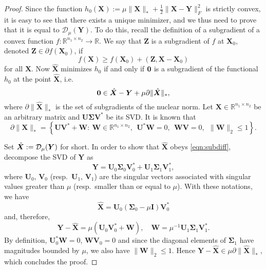 \documentclass[conference,onecolumn,12pt]{IEEEtran}
\newcommand{\R}{\mathbb{R}}
\newcommand{\mtx}[1]{\bm{#1}}
\newcommand{\mymathbf}[1]{\mbox{\boldmath$#1$}}
\newcommand{\goto}{\rightarrow}
\numberwithin{equation}{section}
\numberwithin{figure}{section}
\numberwithin{table}{section}
\theoremstyle{definition}
\begin{document}
  \begin{proof} Since the function $h_0(\mtx{X}) := \mu \|\mtx{X}\|_* +
    \frac{1}{2} \|\mtx{X}-\mtx{Y}\|_F^2$ is strictly convex, it is easy
    to see that there exists a unique minimizer, and we thus need to
    prove that it is equal to $\mathcal{D}_{\mu}(\mtx{Y})$.  To do
    this, recall the definition of a subgradient of a convex function $f
    : \R^{n_1 \times n_2} \goto \R$. We say that $\mtx{Z}$ is a
    subgradient of $f$ at $\mtx{X}_0$, denoted $\mtx{Z} \in \partial
    f(\mtx{X}_0)$, if
  \begin{equation}
    \label{eq:subgradient}
    f(\mtx{X}) \ge f(\mtx{X}_0) + (\mtx{Z}, \mtx{X} - \mtx{X}_0)
  \end{equation}
  for all $\mtx{X}$.  Now $\hat{\mtx{X}}$ minimizes $h_0$ if and only if
  $\mymathbf{0}$ is a subgradient of the functional $h_0$ at the point
  $\hat{\mtx{X}}$, i.e.
  \begin{equation}\label{eqn:subdiff}
  \mymathbf{0} \in \hat{\mtx{X}}-\mtx{Y}+\mu\partial\|\hat{\mtx{X}}\|_*,
  \end{equation}
  where $\partial\|\hat{\mtx{X}}\|_*$ is the set of subgradients of the
  nuclear norm. Let $\mtx{X} \in \R^{n_1 \times n_2}$ be an arbitrary
  matrix and $\mtx{U} \mtx{\Sigma} \mtx{V}^*$ be its SVD.  It is known that
  \begin{equation}\label{eqn:subdiffNorm}
    \partial\|\mtx{X}\|_*=\left\{\mtx{U} \mtx{V}^* + \mtx{W} :
      ~\mtx{W}\in\mathbb{R}^{n_1 \times n_2},~~
      \mtx{U}^*\mtx{W}=0,~~
      \mtx{W} \mtx{V} =0,~~
      \|\mtx{W}\|_2\leq1\right\}.
  \end{equation}
  
  Set $\hat{\mtx{X}} := {\cal D}_\mu(\mtx{Y})$ for short. In order to
  show that $\hat{\mtx{X}}$ obeys \eqref{eqn:subdiff}, decompose the SVD
  of $\mtx{Y}$ as
  \[
  \mtx{Y} = \mtx{U}_0 \mtx{\Sigma}_0 \mtx{V}_0^* + \mtx{U}_1 \mtx{\Sigma}_1 \mtx{V}_1^*,
  \]
  where $\mtx{U}_0$, $\mtx{V}_0$ (resp.~$\mtx{U}_1$, $\mtx{V}_1$) are
  the singular vectors associated with singular values greater than
  $\mu$ (resp.~smaller than or equal to $\mu$). With these notations, we
  have
  \[
  \hat{\mtx{X}} = \mtx{U}_0 (\mtx{\Sigma}_0 - \mu \mtx{I})\mtx{V}_0^*
  \]
  and, therefore,
  \[
  \mtx{Y} - \hat{\mtx{X}} = \mu (\mtx{U}_0 \mtx{V}_0^* +
  \mtx{W}), \quad \mtx{W} = \mu^{-1} \mtx{U}_1 \mtx{\Sigma}_1
  \mtx{V}_1^*.
  \]
  By definition, $\mtx{U}_0^* \mtx{W} = 0$, $\mtx{W} \mtx{V}_0 = 0$ and
  since the diagonal elements of $\mtx{\Sigma}_1$ have magnitudes
  bounded by $\mu$, we also have $\|\mtx{W}\|_2 \le 1$. Hence $\mtx{Y} -
  \hat{\mtx{X}} \in \mu \partial\|\hat{\mtx{X}}\|_*$, which concludes the
  proof.
  \end{proof}
\end{document}
